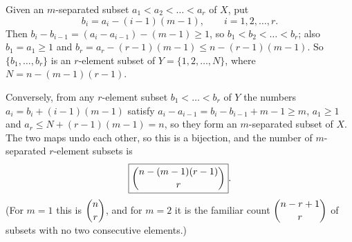 Given an $m$-separated subset $a_1<a_2<\dots<a_r$ of $X$, put
\[
b_i=a_i-(i-1)(m-1),\qquad i=1,2,\dots,r .
\]
Then $b_i-b_{i-1}=(a_i-a_{i-1})-(m-1)\ge1$, so $b_1<b_2<\dots<b_r$; also $b_1=a_1\ge1$ and $b_r=a_r-(r-1)(m-1)\le n-(r-1)(m-1)$. So $\{b_1,\dots,b_r\}$ is an $r$-element subset of $Y=\{1,2,\dots,N\}$, where $N=n-(m-1)(r-1)$.

Conversely, from any $r$-element subset $b_1<\dots<b_r$ of $Y$ the numbers $a_i=b_i+(i-1)(m-1)$ satisfy $a_i-a_{i-1}=b_i-b_{i-1}+m-1\ge m$, $a_1\ge1$ and $a_r\le N+(r-1)(m-1)=n$, so they form an $m$-separated subset of $X$. The two maps undo each other, so this is a bijection, and the number of $m$-separated $r$-element subsets is
\[
\boxed{\dbinom{n-(m-1)(r-1)}{r}}.
\]
(For $m=1$ this is $\dbinom nr$, and for $m=2$ it is the familiar count $\dbinom{n-r+1}{r}$ of subsets with no two consecutive elements.)
